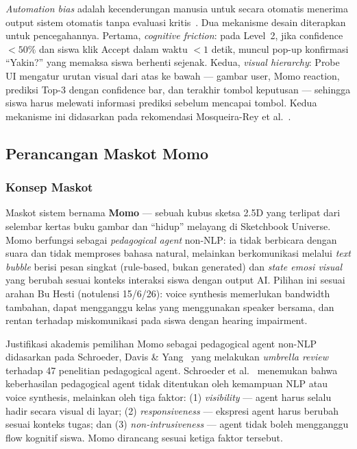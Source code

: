 \documentclass[12pt,a4paper,oneside,openany]{report}
\begin{document}
\textit{Automation bias} adalah kecenderungan manusia untuk secara otomatis menerima output sistem otomatis tanpa evaluasi kritis~\cite{ref4}. Dua mekanisme desain diterapkan untuk pencegahannya. Pertama, \textit{cognitive friction}: pada Level~2, jika confidence $< 50\%$ dan siswa klik Accept dalam waktu $< 1$ detik, muncul pop-up konfirmasi ``Yakin?'' yang memaksa siswa berhenti sejenak. Kedua, \textit{visual hierarchy}: Probe UI mengatur urutan visual dari atas ke bawah --- gambar user, Momo reaction, prediksi Top-3 dengan confidence bar, dan terakhir tombol keputusan --- sehingga siswa harus melewati informasi prediksi sebelum mencapai tombol. Kedua mekanisme ini didasarkan pada rekomendasi Mosqueira-Rey et al.~\cite{ref4}.

\subsection{Perancangan Maskot Momo}
\label{subsec:maskot-momo}

\subsubsection{Konsep Maskot}

Maskot sistem bernama \textbf{Momo} --- sebuah kubus sketsa 2.5D yang terlipat dari selembar kertas buku gambar dan ``hidup'' melayang di Sketchbook Universe. Momo berfungsi sebagai \textit{pedagogical agent} non-NLP: ia tidak berbicara dengan suara dan tidak memproses bahasa natural, melainkan berkomunikasi melalui \textit{text bubble} berisi pesan singkat (rule-based, bukan generated) dan \textit{state emosi visual} yang berubah sesuai konteks interaksi siswa dengan output AI. Pilihan ini sesuai arahan Bu Hesti (notulensi 15/6/26): voice synthesis memerlukan bandwidth tambahan, dapat mengganggu kelas yang menggunakan speaker bersama, dan rentan terhadap miskomunikasi pada siswa dengan hearing impairment.

Justifikasi akademis pemilihan Momo sebagai pedagogical agent non-NLP didasarkan pada Schroeder, Davis \& Yang~\cite{ref8} yang melakukan \textit{umbrella review} terhadap 47 penelitian pedagogical agent. Schroeder et al.~\cite{ref8} menemukan bahwa keberhasilan pedagogical agent tidak ditentukan oleh kemampuan NLP atau voice synthesis, melainkan oleh tiga faktor: (1) \textit{visibility} --- agent harus selalu hadir secara visual di layar; (2) \textit{responsiveness} --- ekspresi agent harus berubah sesuai konteks tugas; dan (3) \textit{non-intrusiveness} --- agent tidak boleh mengganggu flow kognitif siswa. Momo dirancang sesuai ketiga faktor tersebut.
\end{document}
